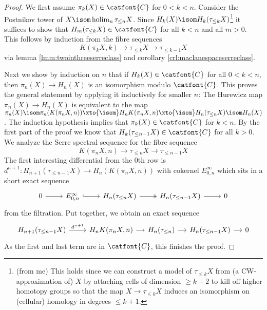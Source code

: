 \begin{proof}
	We first assume $\pi_k(X) \in \catfont{C}$ for $0 < k < n$.
	Consider the Postnikov tower of $X \isom \holim_n \tau_{\leq n} X$.
	Since $H_k(X) \isom H_k(\tau_{\leq k} X)$\footnote{(from me) This holds since we can construct a model of $\tau_{\leq k} X$ from (a CW-approximation of) $X$ by attaching cells of dimension $\geq k + 2$ to kill off higher homotopy groups so that the map $X \to \tau_{\leq k} X$ induces an isomorphism on (cellular) homology in degrees $\leq k + 1$.} it suffices to show that $H_m(\tau_{\leq k} X) \in \catfont{C}$ for all $k < n$ and all $m > 0$.
	This follows by induction from the fibre sequences
	\begin{equation*}
		K(\pi_k X, k) \to \tau_{\leq k} X \to \tau_{\leq k - 1} X
	\end{equation*}
	via lemma \ref{lmm:twointhreeserreclass} and corollary \ref{crl:maclanespaceserreclass}.

	Next we show by induction on $n$ that if $H_k(X) \in \catfont{C}$ for all $0 < k < n$, then $\pi_n(X) \to H_n(X)$ is an isomorphism modulo $\catfont{C}$.
	This proves the general statement by applying it inductively for smaller $n$:
	The Hurewicz map $\pi_n(X) \to H_n(X)$ is equivalent to the map $\pi_n(X) \isom \pi_n(K(\pi_n X, n)) \xto{\isom} H_n K(\pi_n X, n) \xto{\isom} H_n(\tau_{\leq n} X) \isom H_n(X)$.
	The induction hypothesis implies that $\pi_k(X) \in \catfont{C}$ for $k < n$.
	By the first part of the proof we know that $H_k(\tau_{\leq n - 1} X) \in \catfont{C}$ for all $k > 0$.
	We analyze the Serre spectral sequence for the fibre sequence
	\begin{equation*}
		K(\pi_n X, n) \to \tau_{\leq n} X \to \tau_{\leq n - 1} X
	\end{equation*}
	The first interesting differential from the 0th row is $d^{n + 1}\colon H_{n + 1}(\tau_{\leq n - 1} X) \to H_n(K(\pi_n X, n))$ with cokernel $E^\infty_{0, n}$ which sits in a short exact sequence
	\begin{equation*}
		\begin{tikzcd}
			0
					\ar[r]
				& E^\infty_{0, n}
					\ar[r, hook]
				& H_n(\tau_{\leq n} X)
					\ar[r, two heads]
				& H_n(\tau_{\leq n - 1} X)
					\ar[r]
				& 0
		\end{tikzcd}
	\end{equation*}
	from the filtration.
	Put together, we obtain an exact sequence
	\begin{equation*}
		\begin{tikzcd}[column sep = small]
			H_{n + 1}(\tau_{\leq n - 1} X)
					\ar[r, "d^{n + 1}"]
				&[1.2em] H_n K(\pi_n X, n) 
					\ar[r]
				& H_n(\tau_{\leq n})
					\ar[r]
				& H_n(\tau_{\leq n - 1} X) 
					\ar[r]
				& 0
		\end{tikzcd}
	\end{equation*}
	As the first and last term are in $\catfont{C}$, this finishes the proof.
\end{proof}
